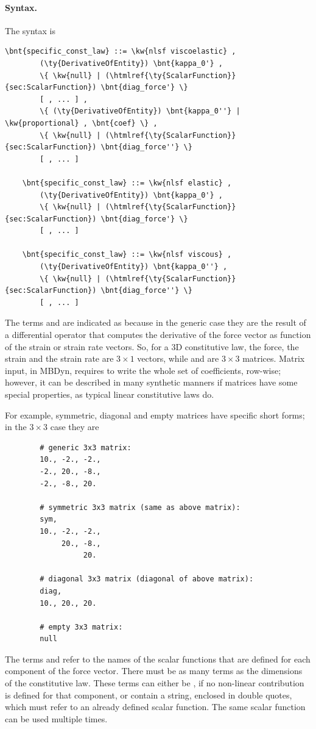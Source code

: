 \paragraph{Syntax.}
\label{sec:CL:nlsf-syntax}
The syntax is
\begin{Verbatim}[commandchars=\\\{\}]
    \bnt{specific_const_law} ::= \kw{nlsf viscoelastic} ,
        (\ty{DerivativeOfEntity}) \bnt{kappa_0'} ,
        \{ \kw{null} | (\htmlref{\ty{ScalarFunction}}{sec:ScalarFunction}) \bnt{diag_force'} \}
        [ , ... ] ,
        \{ (\ty{DerivativeOfEntity}) \bnt{kappa_0''} | \kw{proportional} , \bnt{coef} \} ,
        \{ \kw{null} | (\htmlref{\ty{ScalarFunction}}{sec:ScalarFunction}) \bnt{diag_force''} \}
        [ , ... ]

    \bnt{specific_const_law} ::= \kw{nlsf elastic} ,
        (\ty{DerivativeOfEntity}) \bnt{kappa_0'} ,
        \{ \kw{null} | (\htmlref{\ty{ScalarFunction}}{sec:ScalarFunction}) \bnt{diag_force'} \}
        [ , ... ]

    \bnt{specific_const_law} ::= \kw{nlsf viscous} ,
        (\ty{DerivativeOfEntity}) \bnt{kappa_0''} ,
        \{ \kw{null} | (\htmlref{\ty{ScalarFunction}}{sec:ScalarFunction}) \bnt{diag_force''} \}
        [ , ... ]
\end{Verbatim}
The terms  and  are indicated as
 because in the generic case they are the result
of a differential operator that computes the derivative of the force vector
as function of the strain or strain rate vectors.
So, for a 3D constitutive law, the force, the strain and the strain rate
are $3\times 1$ vectors, while  and 
are $3\times 3$ matrices.
Matrix input, in MBDyn, requires to write the whole set of coefficients,
row-wise; however, it can be described in many synthetic manners if
matrices have some special properties, as typical linear constitutive laws do.

For example, symmetric, diagonal and empty matrices have specific
short forms; in the $3\times 3$ case they are
\begin{verbatim}
        # generic 3x3 matrix:
        10., -2., -2.,
        -2., 20., -8.,
        -2., -8., 20.

        # symmetric 3x3 matrix (same as above matrix):
        sym,
        10., -2., -2.,
             20., -8.,
                  20.

        # diagonal 3x3 matrix (diagonal of above matrix):
        diag,
        10., 20., 20.

        # empty 3x3 matrix:
        null
\end{verbatim}
The terms  and  refer
to the names of the scalar functions that are defined for each component
of the force vector.
There must be as many terms as the dimensions of the constitutive law.
These terms can either be , if no non-linear contribution
is defined for that component, or contain a string, enclosed in double quotes,
which must refer to an already defined scalar function.
The same scalar function can be used multiple times.


